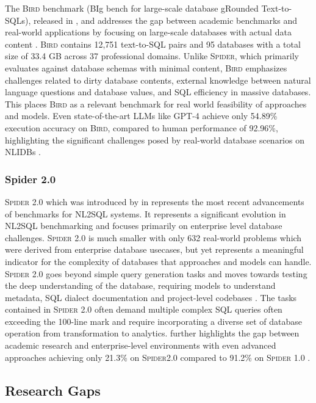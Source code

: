 The \textsc{Bird} benchmark (BIg bench for large-scale database gRounded Text-to-SQLs), released in \citeyear{BIRD},
and addresses the gap between academic benchmarks and real-world applications by focusing on large-scale databases
with actual data content \citep{BIRD}. \textsc{Bird} contains 12,751 text-to-SQL pairs and 95 databases with a total
size of 33.4 GB across 37 professional domains. Unlike \textsc{Spider}, which primarily evaluates against database
schemas with minimal content, \textsc{Bird} emphasizes challenges related to dirty database contents, external
knowledge between natural language questions and database values, and SQL efficiency in massive databases. This
places \textsc{Bird} as a relevant benchmark for real world feasibility of approaches and models. Even state-of-the-art
LLMs like GPT-4 achieve only 54.89\% execution accuracy on \textsc{Bird}, compared to human performance of 92.96\%,
highlighting the significant challenges posed by real-world database scenarios on NLIDBs \citep{BIRD}.

\subsubsection{Spider 2.0}

\textsc{Spider 2.0} which was introduced by \citeauthor*{Spider2} in \citeyear{Spider2} represents the most recent
advancements of benchmarks for NL2SQL systems. It represents a significant evolution in NL2SQL benchmarking and focuses
primarily on enterprise level database challenges. \textsc{Spider 2.0} is much smaller with only 632 real-world problems
which were derived from enterprise database usecases, but yet represents a meaningful indicator for the complexity of
databases that approaches and models can handle. \textsc{Spider 2.0} goes beyond simple query generation tasks and moves
towards testing the deep understanding of the database, requiring models to understand metadata, SQL dialect documentation
and project-level codebases \citep{Spider2}. The tasks contained in \textsc{Spider 2.0} often demand multiple complex SQL
queries often exceeding the 100-line mark and require incorporating a diverse set of database operation from transformation
to analytics. \citeauthor{Spider2} further highlights the gap between academic research and enterprise-level environments
with even advanced approaches achieving only 21.3\% on \textsc{Spider2.0} compared to 91.2\% on \textsc{Spider 1.0}
\citep{Spider, Spider2}.

\subsection{Research Gaps}

